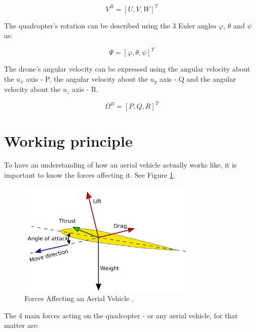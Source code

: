 \begin{equation}
	V^{B}=[U, V, W] ^{T}
\end{equation} 

The quadcopter's rotation can be described using the 3 Euler angles $\varphi$, $\theta$ and $\psi$ as:

\begin{equation}
	\Psi=[\varphi, \theta, \psi] ^{T}
\end{equation} 

The drone's angular velocity can be expressed using the angular velocity about the $u_{x}$ axis - P, the angular velocity about the $u_{y}$ axis - Q and the angular velocity about the $u_{z}$ axis - R.

\begin{equation}
	\Omega^{B}=[P, Q, R] ^{T}
\end{equation} 

\section{Working principle}

To have an understanding of how an aerial vehicle actually works like, it is important to know the forces affecting it. See Figure \ref{droneForces}.

\begin{figure}[H]
  \centering
    \includegraphics[width=0.75\textwidth]{images/forces.png}
	\caption{Forces Affecting an Aerial Vehicle \cite{ForcesFig}.}
	\label{droneForces}
\end{figure}

The 4 main forces acting on the quadcopter - or any aerial vehicle, for that matter are:

